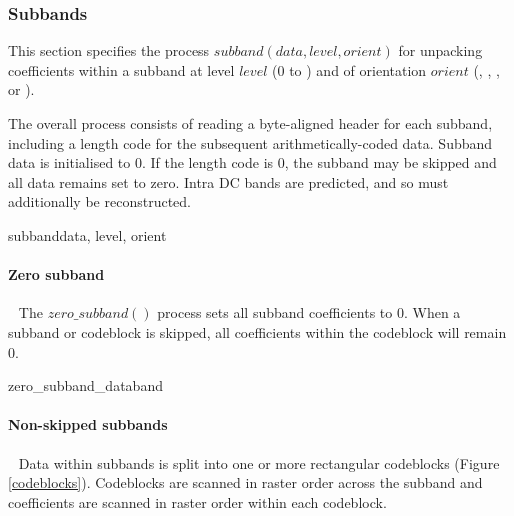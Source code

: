 \subsubsection{Subbands}

\label{subbanddecodeprocess}

This section specifies the process $subband(data, level,orient)$ for unpacking coefficients
within a subband at level $level$ ($0$ to \TransformDepth) and of orientation $orient$
(\LL, \LH, \HL, or \HH). 

The overall process consists of reading a byte-aligned header for each
subband, including a length code for the subsequent arithmetically-coded data.
Subband data is initialised to 0. If the length code is 0, the subband may be 
skipped and all data remains set to zero.
Intra DC bands are predicted, and so must additionally be reconstructed.

\begin{pseudo}{subband}{data, level, orient}
\bsELSE
\bsEND 
{}
\bsEND
\end{pseudo}

\paragraph{Zero subband}
\label{zerosubband}
$\ $\newline$\ $\newline
The $zero\_subband()$ process sets all subband coefficients to 0. When
a subband or codeblock is skipped, all coefficients within the codeblock
will remain 0. 

\begin{pseudo}{zero\_subband\_data}{band}
  \bsEND
\bsEND
\end{pseudo}

\paragraph{Non-skipped subbands}
\label{subbandcoeffs}
$\ $\newline$\ $\newline
Data within subbands is split into one or more rectangular codeblocks (Figure \ref{codeblocks}).
Codeblocks are scanned in raster order across the subband and coefficients are scanned in raster order
within each codeblock. 

